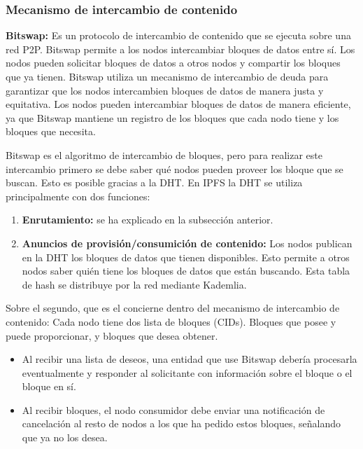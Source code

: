 \subsubsection{Mecanismo de intercambio de contenido}

\textbf{Bitswap:} Es un protocolo de intercambio de contenido que se ejecuta sobre una red P2P. Bitswap permite a los nodos intercambiar bloques de datos entre
sí. Los nodos pueden solicitar bloques de datos a otros nodos y compartir los bloques que ya tienen. Bitswap utiliza un mecanismo de intercambio de deuda para
garantizar que los nodos intercambien bloques de datos de manera justa y equitativa. Los nodos pueden intercambiar bloques de datos de manera eficiente, ya que
Bitswap mantiene un registro de los bloques que cada nodo tiene y los bloques que necesita.

Bitswap es el algoritmo de intercambio de bloques, pero para realizar este intercambio primero se debe saber qué nodos pueden proveer los bloque que se buscan.
Esto es posible gracias a la DHT. En IPFS la DHT se utiliza principalmente con dos funciones:
\begin{enumerate}
      \item \textbf{Enrutamiento:} se ha explicado en la subsección anterior.
      \item \textbf{Anuncios de provisión/consumición de contenido:} Los nodos publican en la DHT los bloques de datos que tienen disponibles. Esto permite a otros nodos saber quién tiene los bloques de datos que están buscando. Esta tabla de hash se distribuye por la red mediante Kademlia.
\end{enumerate}

Sobre el segundo, que es el concierne dentro del mecanismo de intercambio de contenido: Cada nodo tiene dos lista de bloques (CIDs). Bloques que posee y puede
proporcionar, y bloques que desea obtener.
\begin{itemize}
      \item Al recibir una lista de deseos, una entidad que use Bitswap debería procesarla eventualmente y responder al solicitante con información sobre el bloque o el bloque en sí.
      \item Al recibir bloques, el nodo consumidor debe enviar una notificación de cancelación al resto de nodos a los que ha pedido estos bloques, señalando que  ya no los desea.
\end{itemize}

